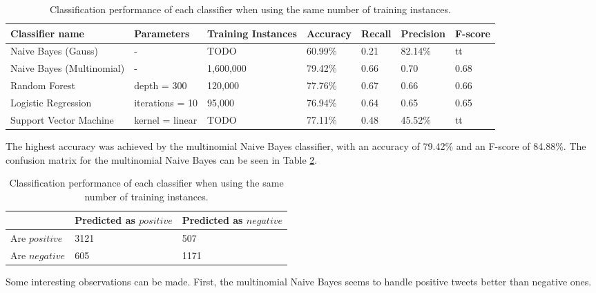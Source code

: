 \begin{table}[]
\centering
\caption{Classification performance of each classifier when using the same number of training instances.}
\begin{tabular}{ |p{3cm}||p{3cm}|p{2cm}|p{1.5cm}|p{1.5cm}|p{1.5cm}|p{1.5cm}| }
 \hline
 Classifier name &          Parameters &             Training Instances &    Accuracy &      Recall &     Precision& F-score \\
 \hline
 Naive Bayes (Gauss)        &-&            TODO&                 60.99\%&        0.21&       82.14\%& tt\\
  \hline
 Naive Bayes (Multinomial)  &-&                     1,600,000&                79.42\%&        0.66&       0.70& 0.68\\
  \hline
 Random Forest              &depth = 300&            120,000&                 77.76\%&        0.67&       0.66& 0.66\\
  \hline
 Logistic Regression        &iterations = 10&            95,000&                 76.94\%&        0.64&       0.65& 0.65\\
  \hline
 Support Vector Machine     &kernel = linear&            TODO&                 77.11\%&        0.48&       45.52\%& tt\\
 \hline
\end{tabular}
\label{tab:evaluations_euqal}
\end{table}

The highest accuracy was achieved by the multinomial Naive Bayes classifier, with an accuracy of 79.42\% and an F-score of 84.88\%. The confusion matrix for the multinomial Naive Bayes can be seen in Table \ref{tab:evaluations_conf}.
\begin{table}[]
\centering
\caption{Classification performance of each classifier when using the same number of training instances.}
\begin{tabular}{ |p{3cm}||p{3cm}|p{3cm}| }
 \hline
  &          Predicted as $positive$ &Predicted as $negative$  \\
 \hline
 Are $positive$        & 3121&            507\\
  \hline
 Are $negative$  &605&                     1171\\
 \hline

\end{tabular}
\label{tab:evaluations_conf}
\end{table}


Some interesting observations can be made. First, the multinomial Naive Bayes seems to handle positive tweets better than negative ones.

